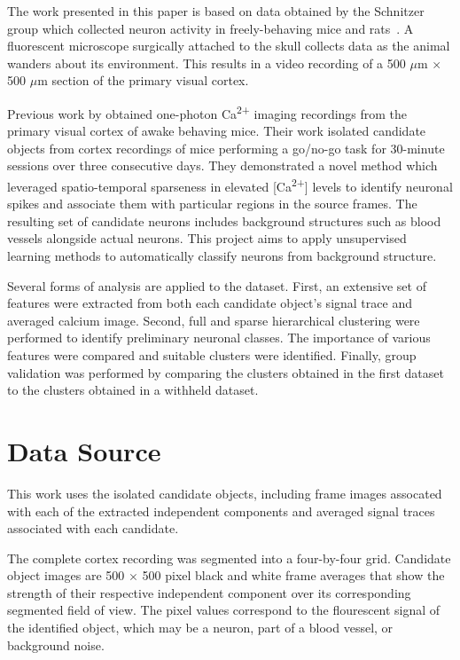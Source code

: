 \documentclass[10pt]{article}
\newcommand{\calcium}[0]{Ca\textsuperscript{2+}}
\begin{document}
The work presented in this paper is based on data obtained by the Schnitzer group which collected neuron activity in freely-behaving mice and rats~\cite{Ghosh2011}. 
A fluorescent microscope surgically attached to the skull collects data as the animal wanders about its environment.
This results in a video recording of a \num{500} $\mu$m $\times$ \num{500} $\mu$m section of the primary visual cortex.


Previous work by \citeauthor{Mukamel2009} obtained one-photon {\calcium} imaging recordings from the primary visual cortex of awake behaving mice.
Their work isolated candidate objects from cortex recordings of mice performing a go/no-go task for \num{30}-minute sessions over three consecutive days.
They demonstrated a novel method which leveraged spatio-temporal sparseness in elevated [\calcium] levels to identify neuronal spikes and associate them with particular regions in the source frames.
The resulting set of candidate neurons includes background structures such as blood vessels alongside actual neurons.
This project aims to apply unsupervised learning methods to automatically classify neurons from background structure.

Several forms of analysis are applied to the dataset.
First, an extensive set of features were extracted from both each candidate object's signal trace and averaged calcium image.
Second, full and sparse hierarchical clustering were performed to identify preliminary neuronal classes.
The importance of various features were compared and suitable clusters were identified.
Finally, group validation was performed by comparing the clusters obtained in the first dataset to the clusters obtained in a withheld dataset.

\section{Data Source}


This work uses the isolated candidate objects, including frame images assocated with each of the extracted independent components and averaged signal traces associated with each candidate.

The complete cortex recording was segmented into a four-by-four grid.
Candidate object images are \num{500} $\times$ \num{500} pixel black and white frame averages that show the strength of their respective independent component over its corresponding segmented field of view. 
The pixel values correspond to the flourescent signal of the identified object, which may be a neuron, part of a blood vessel, or background noise.
\end{document}

